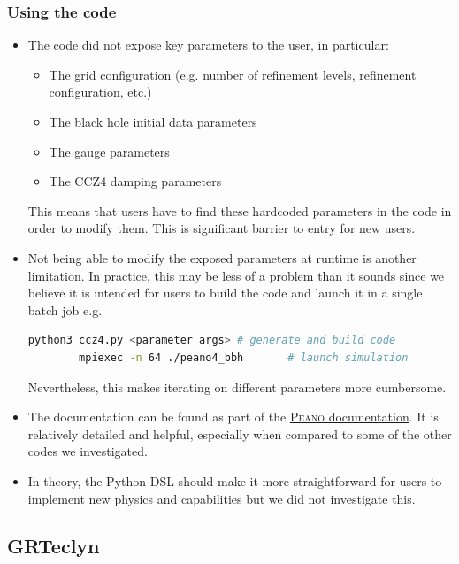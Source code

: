 \documentclass[12pt,a4paper]{article}
\numberwithin{figure}{subsection}
\newcommand{\peano}{\textsc{Peano}\xspace}
\begin{document}
\subsubsection{Using the code}
\begin{itemize}
    \item The code did not expose key parameters to the user, in particular:
    \begin{itemize}
        \item The grid configuration (e.g. number of refinement levels,
        refinement configuration, etc.)
        \item The black hole initial data parameters
        \item The gauge parameters
        \item The CCZ4 damping parameters
    \end{itemize}
    This means that users have to find these hardcoded parameters in the code in
    order to modify them. This is significant barrier to entry for new users.
    \item Not being able to modify the exposed parameters at runtime is another
    limitation. In practice, this may be less of a problem than it sounds since
    we believe it is intended for users to build the code and launch it in a
    single batch job e.g.
    \begin{lstlisting}[style=shortcode,language=bash]
        python3 ccz4.py <parameter args> # generate and build code
        mpiexec -n 64 ./peano4_bbh       # launch simulation
    \end{lstlisting}
    Nevertheless, this makes iterating on different parameters more cumbersome.
    \item The documentation can be found as part of the
    \href{https://hpcsoftware.pages.gitlab.lrz.de/Peano/}{\peano documentation}.
    It is relatively detailed and helpful, especially when compared to some of
    the other codes we investigated.
    \item In theory, the Python DSL should make it more straightforward for
    users to implement new physics and capabilities but we did not investigate
    this.
\end{itemize}

\subsection{GRTeclyn}
\end{document}
